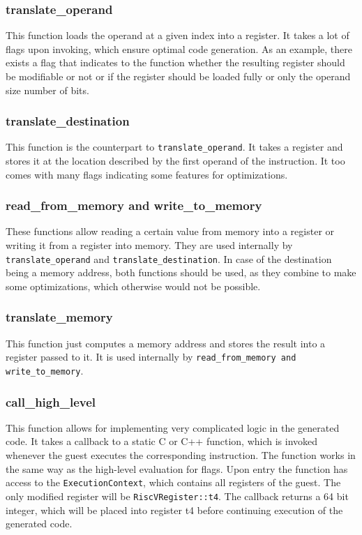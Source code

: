 	\subsubsection{translate\_operand}
	This function loads the operand at a given index into a register. It takes a lot of flags upon invoking, which ensure optimal code generation. As an example, there exists a flag that indicates to the function whether the resulting register should be modifiable or not or if the register should be loaded fully or only the operand size number of bits.
	
	\subsubsection{translate\_destination}
	This function is the counterpart to \texttt{translate\_operand}. It takes a register and stores it at the location described by the first operand of the instruction. It too comes with many flags indicating some features for optimizations.
	
	\subsubsection{read\_from\_memory and write\_to\_memory}
	These functions allow reading a certain value from memory into a register or writing it from a register into memory. They are used internally by \texttt{translate\_operand} and \texttt{translate\_destination}. In case of the destination being a memory address, both functions should be used, as they combine to make some optimizations, which otherwise would not be possible. 
	
	\subsubsection{translate\_memory}
	This function just computes a memory address and stores the result into a register passed to it. It is used internally by \texttt{read\_from\_memory and write\_to\_memory}.
	
	\subsubsection{call\_high\_level}
	This function allows for implementing very complicated logic in the generated code. It takes a callback to a static C or C++ function, which is invoked whenever the guest executes the corresponding instruction. The function works in the same way as the high-level evaluation for flags. Upon entry the function has access to the \texttt{ExecutionContext}, which contains all registers of the guest. The only modified register will be \texttt{RiscVRegister::t4}. The callback returns a 64 bit integer, which will be placed into register t4 before continuing execution of the generated code. 
	
